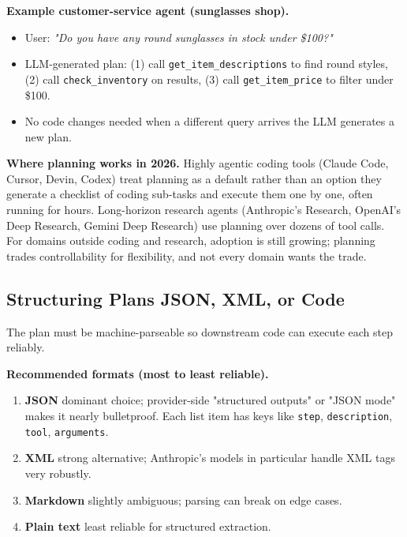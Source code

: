 \documentclass[a4paper,11pt]{article}
\begin{document}
\textbf{Example \textemdash{} customer-service agent (sunglasses
shop).}
\begin{itemize}[noitemsep, leftmargin=1.2em]
  \item User: \textit{"Do you have any round sunglasses in stock
        under \$100?"}
  \item LLM-generated plan: (1) call \texttt{get\_item\_descriptions}
        to find round styles, (2) call \texttt{check\_inventory} on
        results, (3) call \texttt{get\_item\_price} to filter under
        \$100.
  \item No code changes needed when a different query arrives
        \textemdash{} the LLM generates a new plan.
\end{itemize}

\begin{ambercallout}
\textbf{Where planning works in 2026.}
Highly agentic coding tools (Claude Code, Cursor, Devin, Codex)
treat planning as a default rather than an option \textemdash{} they
generate a checklist of coding sub-tasks and execute them one by
one, often running for hours. Long-horizon research agents
(Anthropic's Research, OpenAI's Deep Research, Gemini Deep Research)
use planning over dozens of tool calls. For domains outside coding
and research, adoption is still growing; planning trades
controllability for flexibility, and not every domain wants the
trade.
\end{ambercallout}

\subsection{Structuring Plans \textemdash{} JSON, XML, or Code}

The plan must be machine-parseable so downstream code can execute
each step reliably.

\textbf{Recommended formats (most to least reliable).}
\begin{enumerate}[noitemsep, leftmargin=1.4em]
  \item \textbf{JSON} \textemdash{} dominant choice; provider-side
        "structured outputs" or "JSON mode" makes it nearly
        bulletproof. Each list item has keys like \texttt{step},
        \texttt{description}, \texttt{tool}, \texttt{arguments}.
  \item \textbf{XML} \textemdash{} strong alternative; Anthropic's
        models in particular handle XML tags very robustly.
  \item \textbf{Markdown} \textemdash{} slightly ambiguous; parsing
        can break on edge cases.
  \item \textbf{Plain text} \textemdash{} least reliable for
        structured extraction.
\end{enumerate}
\end{document}
